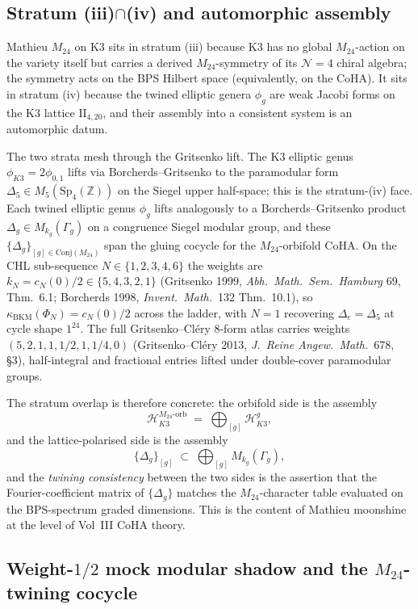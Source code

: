 \subsection{Stratum (iii)$\cap$(iv) and automorphic assembly}
\label{subsec:m24-strata-overlap}

Mathieu $M_{24}$ on K3 sits in stratum (iii) because K3 has no global $M_{24}$-action on the variety itself but carries a derived $M_{24}$-symmetry of its $\mathcal{N}=4$ chiral algebra; the symmetry acts on the BPS Hilbert space (equivalently, on the CoHA). It sits in stratum (iv) because the twined elliptic genera $\phi_g$ are weak Jacobi forms on the K3 lattice $\mathrm{II}_{4,20}$, and their assembly into a consistent system is an automorphic datum.

The two strata mesh through the Gritsenko lift. The K3 elliptic genus $\phi_{K3} = 2 \phi_{0,1}$ lifts via Borcherds--Gritsenko to the paramodular form $\Delta_5 \in M_5(\mathrm{Sp}_4(\mathbb{Z}))$ on the Siegel upper half-space; this is the stratum-(iv) face. Each twined elliptic genus $\phi_g$ lifts analogously to a Borcherds--Gritsenko product $\Delta_g \in M_{k_g}(\Gamma_g)$ on a congruence Siegel modular group, and these $\{\Delta_g\}_{[g] \in \mathrm{Conj}(M_{24})}$ span the gluing cocycle for the $M_{24}$-orbifold CoHA. On the CHL sub-sequence $N \in \{1, 2, 3, 4, 6\}$ the weights are $k_N = c_N(0)/2 \in \{5, 4, 3, 2, 1\}$ (Gritsenko 1999, \emph{Abh.\ Math.\ Sem.\ Hamburg} 69, Thm.~6.1; Borcherds 1998, \emph{Invent.\ Math.}\ 132 Thm.~10.1), so $\kappa_{\mathrm{BKM}}(\Phi_N) = c_N(0)/2$ across the ladder, with $N = 1$ recovering $\Delta_e = \Delta_5$ at cycle shape $1^{24}$. The full Gritsenko--Cl\'ery 8-form atlas carries weights $(5, 2, 1, 1, 1/2, 1, 1/4, 0)$ (Gritsenko--Cl\'ery 2013, \emph{J.\ Reine Angew.\ Math.}\ 678, \S 3), half-integral and fractional entries lifted under double-cover paramodular groups.

The stratum overlap is therefore concrete: the orbifold side is the assembly
\[
\mathcal{H}_{K3}^{M_{24}\text{-orb}} \;=\; \bigoplus_{[g]} \mathcal{H}_{K3}^g,
\]
and the lattice-polarised side is the assembly
\[
\{\Delta_g\}_{[g]} \;\subset\; \bigoplus_{[g]} M_{k_g}(\Gamma_g),
\]
and the \emph{twining consistency} between the two sides is the assertion that the Fourier-coefficient matrix of $\{\Delta_g\}$ matches the $M_{24}$-character table evaluated on the BPS-spectrum graded dimensions. This is the content of Mathieu moonshine at the level of Vol~III CoHA theory.

\subsection{Weight-\texorpdfstring{$1/2$}{1/2} mock modular shadow and the $M_{24}$-twining cocycle}
\label{subsec:mock-shadow-twining}

